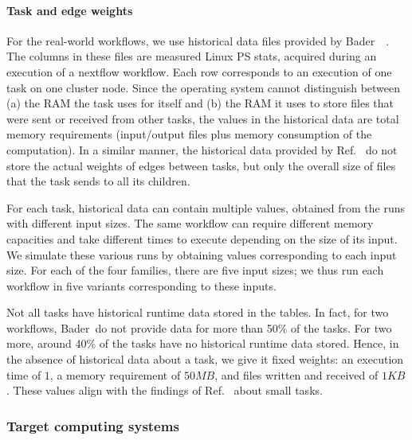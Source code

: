 \documentclass[conference]{IEEEtran}
\newcommand{\skug}[1]{{\color{blue}[SK: #1]}}
\begin{document}
\paragraph{Task and edge weights}
For the real-world workflows, we use historical data files provided by Bader~\etal~\cite{lotaru}.
The columns in these files are measured Linux PS stats, acquired during an execution of a nextflow workflow.
Each row corresponds to an execution of one task on one cluster node.
Since the operating system cannot distinguish between (a) the RAM the task uses for itself and (b) the RAM it uses
to store files that were sent or received from other tasks, the values in the historical data are total memory requirements (input/output files plus memory consumption of the computation).
In a similar manner, the historical data provided by Ref.~\cite{lotaru} do not store the actual weights of edges between tasks, but only the overall
size of files that the task sends to all its children.

For each task, historical data can contain multiple values, obtained from the runs with different input sizes.
The same workflow can require different memory capacities and take different times to execute
depending on the size of its input.
We simulate these various runs by obtaining values corresponding to each input size.
For each of the four families, there are five input sizes; we thus run each workflow in five variants corresponding to these inputs.

Not all tasks have historical runtime data stored in the tables.
In fact, for two workflows, Bader~\etal do not provide data for more than 50\% of the tasks.
For two more, around 40\% of the tasks have no historical runtime data stored.
Hence, in the absence of historical data about a task, we give it fixed weights:
an execution time of $1$, a memory requirement of $50 MB$, and files written and received of $1KB$.
These values align with the findings of Ref.~\cite{lotaru} about small tasks.

\medskip

\subsubsection{Target computing systems}
\end{document}
